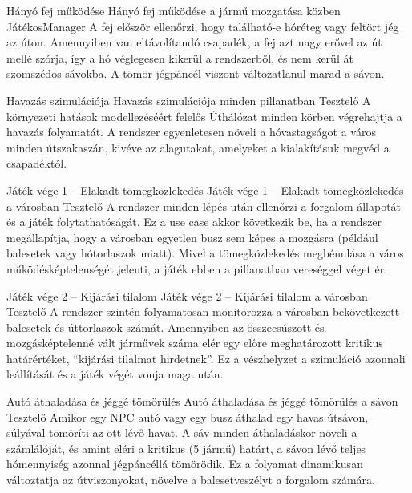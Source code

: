 \begin{use-case}
    {Hányó fej működése}
    {Hányó fej működése a jármű mozgatása közben}
    {JátékosManager}
    A fej először ellenőrzi, hogy található-e hóréteg vagy feltört jég az úton. Amennyiben van eltávolítandó csapadék, a fej azt nagy erővel az út mellé szórja, így a hó véglegesen kikerül a rendszerből, és nem kerül át szomszédos sávokba. A tömör jégpáncél viszont változatlanul marad a sávon. 
\end{use-case}

\begin{use-case}
    {Havazás szimulációja}
    {Havazás szimulációja minden pillanatban}
    {Tesztelő}
    A környezeti hatások modellezéséért felelős Úthálózat minden körben végrehajtja a havazás folyamatát. A rendszer egyenletesen növeli a hóvastagságot a város minden útszakaszán, kivéve az alagutakat, amelyeket a kialakításuk megvéd a csapadéktól. 
\end{use-case}

\begin{use-case}
    {Játék vége 1 – Elakadt tömegközlekedés}
    {Játék vége 1 – Elakadt tömegközlekedés a városban}
    {Tesztelő}
    A rendszer minden lépés után ellenőrzi a forgalom állapotát és a játék folytathatóságát. Ez a use case akkor következik be, ha a rendszer megállapítja, hogy a városban egyetlen busz sem képes a mozgásra (például balesetek vagy hótorlaszok miatt). Mivel a tömegközlekedés megbénulása a város működésképtelenségét jelenti, a játék ebben a pillanatban vereséggel véget ér.
\end{use-case}

\begin{use-case}
    {Játék vége 2 – Kijárási tilalom}
    {Játék vége 2 – Kijárási tilalom a városban}
    {Tesztelő}
    A rendszer szintén folyamatosan monitorozza a városban bekövetkezett balesetek és úttorlaszok számát. Amennyiben az összecsúszott és mozgásképtelenné vált járművek száma elér egy előre meghatározott kritikus határértéket, “kijárási tilalmat hirdetnek”. Ez a vészhelyzet a szimuláció azonnali leállítását és a játék végét vonja maga után.
\end{use-case}

\begin{use-case}
    {Autó áthaladása és jéggé tömörülés}
    {Autó áthaladása és jéggé tömörülés a sávon}
    {Tesztelő}
    Amikor egy NPC autó vagy egy busz áthalad egy havas útsávon, súlyával tömöríti az ott lévő havat. A sáv minden áthaladáskor növeli a számlálóját, és amint eléri a kritikus (5 jármű) határt, a sávon lévő teljes hómennyiség azonnal jégpáncéllá tömörödik. Ez a folyamat dinamikusan változtatja az útviszonyokat, növelve a balesetveszélyt a forgalom számára.
\end{use-case}

